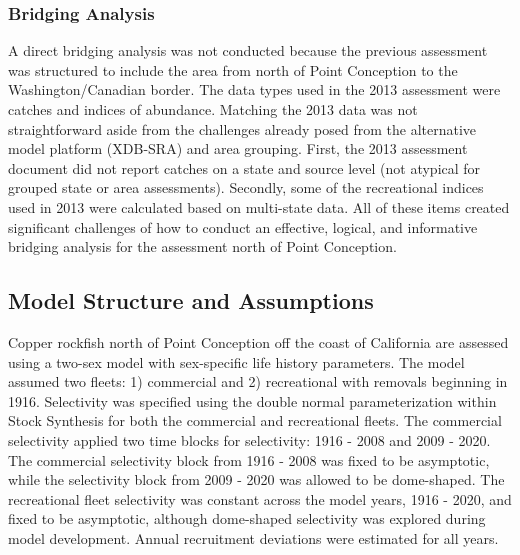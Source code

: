 \documentclass[11pt,
  english,
  a4paper,
]{article}
\begin{document}
\leavevmode\tagmcend\tagstructend\par


\hypertarget{bridging-analysis}{%
\subsubsection{Bridging Analysis}\label{bridging-analysis}}

\leavevmode\tagmcend\tagstructend


A direct bridging analysis was not conducted because the previous assessment was structured to include the area from north of Point Conception to the Washington/Canadian border. The data types used in the 2013 assessment were catches and indices of abundance. Matching the 2013 data was not straightforward aside from the challenges already posed from the alternative model platform (XDB-SRA) and area grouping. First, the 2013 assessment document did not report catches on a state and source level (not atypical for grouped state or area assessments). Secondly, some of the recreational indices used in 2013 were calculated based on multi-state data. All of these items created significant challenges of how to conduct an effective, logical, and informative bridging analysis for the assessment north of Point Conception.

\leavevmode\tagmcend\tagstructend\par


\hypertarget{model-structure-and-assumptions}{%
\subsection{Model Structure and Assumptions}\label{model-structure-and-assumptions}}

\leavevmode\tagmcend\tagstructend


Copper rockfish north of Point Conception off the coast of California are assessed using a two-sex model with sex-specific life history parameters. The model assumed two fleets: 1) commercial and 2) recreational with removals beginning in 1916. Selectivity was specified using the double normal parameterization within Stock Synthesis for both the commercial and recreational fleets. The commercial selectivity applied two time blocks for selectivity: 1916 - 2008 and 2009 - 2020. The commercial selectivity block from 1916 - 2008 was fixed to be asymptotic, while the selectivity block from 2009 - 2020 was allowed to be dome-shaped. The recreational fleet selectivity was constant across the model years, 1916 - 2020, and fixed to be asymptotic, although dome-shaped selectivity was explored during model development. Annual recruitment deviations were estimated for all years.
\end{document}
